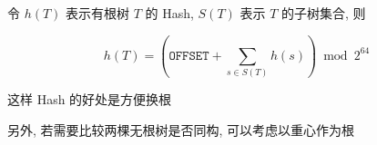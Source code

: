 令 \(h(T)\) 表示有根树 \(T\) 的 Hash, \(S(T)\) 表示 \(T\) 的子树集合, 则

\[
    h(T)=\left(\texttt{OFFSET}+\sum_{s\in S(T)}h(s)\right)\bmod{2^{64}}
\]

这样 Hash 的好处是方便换根

另外, 若需要比较两棵无根树是否同构, 可以考虑以重心作为根
